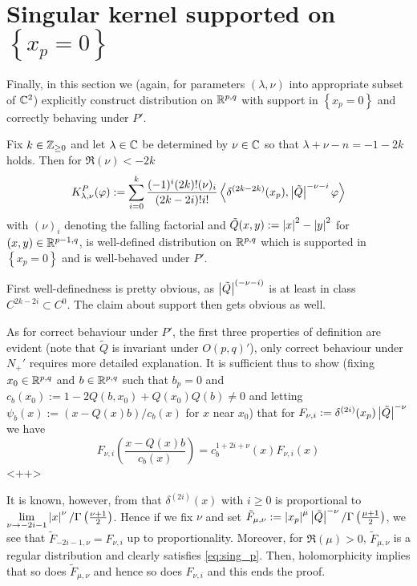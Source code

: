 \documentclass[10pt]{article} %
\theoremstyle{definition}
\theoremstyle{remark}
\begin{document}
\section{Singular kernel supported on $\left\{ x_p=0 \right\}$}
Finally, in this section we (again, for parameters $(\lambda,\nu)$ into appropriate subset of $\mathbb{C}^2$)
explicitly construct distribution on $\mathbb{R}^{p,q}$ with support in $\left\{ x_p=0 \right\}$ and correctly behaving under $P'$.
\begin{myprop}
	Fix $k\in\mathbb{Z}_{\ge0}$ and let $\lambda\in\mathbb{C}$ be determined by $\nu\in\mathbb{C}$ so that $\lambda+\nu-n=-1-2k$ holds.
	Then for $\Re(\nu)<-2k$ 
	\[K_{\lambda,\nu}^P(\varphi):=\sum_{i=0}^k\frac{(-1)^i(2k)!(\nu)_i}{(2k-2i)!i!}
		\myabra{\delta^{(2k-2k)}(x_p),\myabs{\tilde{Q}}^{-\nu-i}\varphi}
	\] with $(\nu)_i$ denoting the falling factorial and $\tilde{Q}(x,y):=\left|x\right|^2-\left|y\right|^2$ for $(x,y)\in\mathbb{R}^{p-1,q}$,
	is well-defined distribution on $\mathbb{R}^{p,q}$ which is supported in $\left\{ x_p=0 \right\}$ and is well-behaved
	under $P'$.
\end{myprop}
\begin{myproof}
	First well-definedness is pretty obvious, as $\left|\tilde{Q}\right|^{(-\nu-i)}$ is at least in class $C^{2k-2i}\subset C^0$.
	The claim about support then gets obvious as well.

	As for correct behaviour under $P'$, the first three properties of definition are evident (note that $\tilde{Q}$ is
	invariant under $O(p,q)'$), only correct behaviour
	under $N_+'$ requires more detailed explanation. It is sufficient thus to show (fixing $x_0\in\mathbb{R}^{p,q}$
	and $b\in\mathbb{R}^{p,q}$ such that $b_p=0$ and $c_b(x_0):=1-2Q(b,x_0)+Q(x_0)Q(b)\neq0$ and letting 
	$\psi_b(x):=(x-Q(x)b)/c_b(x)$ for $x$ near $x_0$) that for $F_{\nu,i}:=\delta^{(2i)}(x_p)\left|\tilde{Q}\right|^{-\nu}$ we have
	\begin{equation}
	F_{\nu,i}\left( \frac{x-Q(x)b}{c_b(x)}\right)=c_b^{1+2i+\nu}(x)F_{\nu,i}(x) 
		\label{eq:sing_p}
	\end{equation}<++>
	
	It is known, however, from \cite[ch. I, sec. 3.5]{gelfand1980distribution}
	that $\delta^{(2i)}(x)$ with $i\geq0$ is proportional to $\lim_{\nu\to-2i-1}\myabs{x}^{\nu}/\Gamma\left( \frac{\nu+1}{2}
	\right)$. Hence if we fix $\nu$ and set $\tilde{F}_{\mu,\nu}:=\left|x_p\right|^{\mu}\left|\tilde{Q}\right|^{-\nu}/\Gamma\left( \frac{\mu
	+1}{2} \right)$, we see that $\tilde{F}_{-2i-1,\nu}=F_{\nu,i}$ up to proportionality. Moreover, for $\Re(\mu)>0$,
	$\tilde{F}_{\mu,\nu}$ is a regular distribution and clearly satisfies \eqref{eq:sing_p}. Then, holomorphicity
	implies that so does $\tilde{F}_{\mu,\nu}$ and hence so does $F_{\nu,i}$ and this ends the proof.
\end{myproof}
\end{document}
